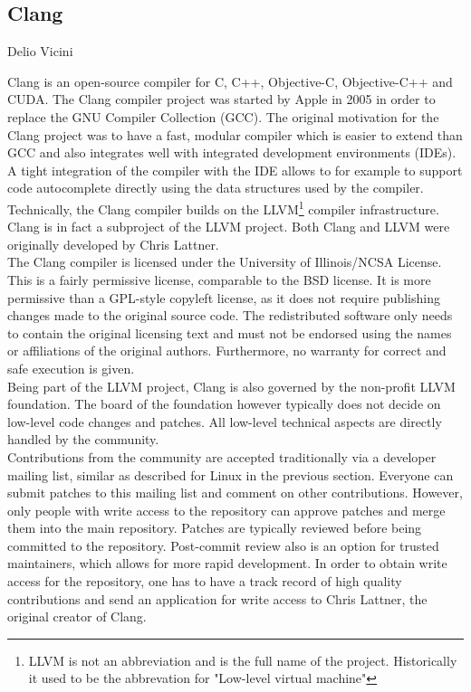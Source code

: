 \subsection{Clang}{Delio Vicini}

Clang is an open-source compiler for C, C++, Objective-C, Objective-C++ and CUDA. The Clang compiler project was started by Apple in 2005 in order to replace the GNU Compiler Collection (GCC). The original motivation for the Clang project was to have a fast, modular compiler which is easier to extend
than GCC and also integrates well with integrated development environments (IDEs).\cite{clang-motivation} A tight integration of the compiler with the IDE allows to for example to support code autocomplete directly using the data structures used by the compiler. Technically, the Clang compiler builds on the LLVM\footnote{LLVM is not an abbreviation and is the full name of the project. Historically it used to be the abbrevation for "Low-level virtual machine"} compiler infrastructure. Clang is in fact a subproject of the LLVM project. Both Clang and LLVM were originally developed by Chris Lattner.\cite{lattner} \\

The Clang compiler is licensed under the University of Illinois/NCSA License.\cite{clang-policy} This is a fairly permissive license, comparable to the BSD license. It is more permissive than a GPL-style copyleft license, as it does not require publishing changes made to the original source code. The redistributed software only needs to contain the original licensing text and must 
not be endorsed using the names or affiliations of the original authors. Furthermore, no warranty for correct and safe execution is given.\cite{illinois-license} \\

Being part of the LLVM project, Clang is also governed by the non-profit LLVM foundation.\cite{llvm-foundation} The board of the foundation however typically does not decide on low-level code changes and patches. All low-level technical aspects are directly handled by the community.\cite{clang-policy} \\

Contributions from the community are accepted traditionally via a developer mailing list, similar as described for Linux in the previous section. Everyone can submit patches to this mailing list and comment on other contributions. However, only people with write access to the repository can approve patches and merge them into the main repository. Patches are typically reviewed before being committed to the repository. Post-commit review also is an option for trusted maintainers, which allows for more rapid development. In order to obtain write access for the repository, one has to have a track record of high quality contributions and send an application for write access to Chris Lattner, the original creator of Clang. \\


